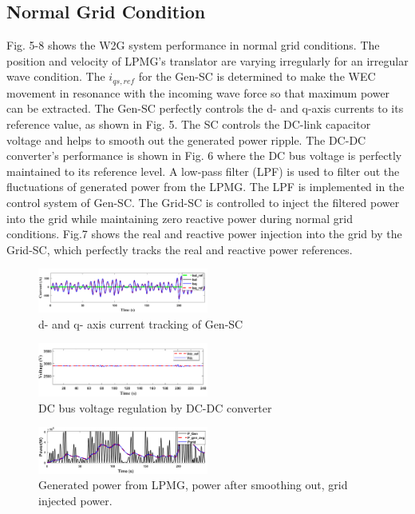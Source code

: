 \documentclass[conference]{IEEEtran}
\begin{document}
\subsection{Normal Grid Condition}
Fig. 5-8 shows the W2G system performance in normal grid conditions. The position and velocity of LPMG’s translator are varying irregularly for an irregular wave condition. The $i_{qs,ref}$ for the Gen-SC is determined to make the WEC movement in resonance with the incoming wave force so that maximum power can be extracted. The Gen-SC perfectly controls the d- and q-axis currents to its reference value, as shown in Fig. 5. The SC controls the DC-link capacitor voltage and helps to smooth out the generated power ripple. The DC-DC converter’s performance is shown in Fig. 6 where the DC bus voltage is perfectly maintained to its reference level. A low-pass filter (LPF) is used to filter out the fluctuations of generated power from the LPMG. The LPF is implemented in the control system of Gen-SC. The Grid-SC is controlled to inject the filtered power into the grid while maintaining zero reactive power during normal grid conditions. Fig.7 shows the real and reactive power injection into the grid by the Grid-SC, which perfectly tracks the real and reactive power references.
\begin{figure}[htbp]
    \centering
    \includegraphics[width=0.5\textwidth]{Figs/5_3_1/gen current.png}
    \caption{d- and q- axis current tracking of Gen-SC}
    \label{fig:W2G_normal_grid}
\end{figure}
\begin{figure}[h!]
    \centering
    \includegraphics[width=0.5\textwidth]{Figs/5_3_1/vdc vdcref.png}
    \caption{DC bus voltage regulation by DC-DC converter}
    \label{fig:LPMG_position_velocity}
\end{figure}
\begin{figure}[h!]
    \centering
    \includegraphics[width=0.5\textwidth]{Figs/5_3_1/power all.png}
    \caption{Generated power from LPMG, power after smoothing out, grid injected power.}
    \label{fig:W2G_normal_grid}
\end{figure}
\end{document}
